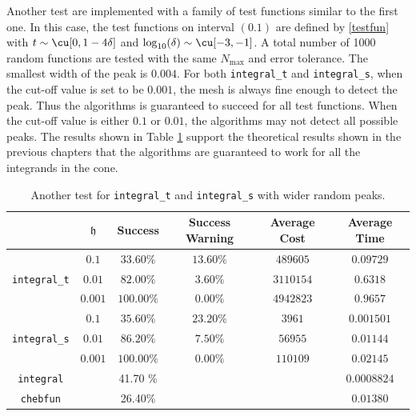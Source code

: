 \documentclass{iitthesis}
\theoremstyle{definition}
\theoremstyle{remark}
\begin{document}
Another test are implemented with a family of test functions similar to the first one. In this case, the test functions on interval $(0.1)$ are defined by \eqref{testfun} with  $t \sim \cu[0,1-4\delta]$ and $\log_{10}(\delta) \sim \cu[-3,-1]$. A total number of 1000 random functions are tested with the same $N_{\max}$ and error tolerance. The smallest width of the peak is $0.004$. For both {\tt integral\_t} and {\tt integral\_s}, when the cut-off value is set to be $0.001$, the mesh is always fine enough to detect the peak. Thus the algorithms is guaranteed to succeed for all test functions. When the cut-off value is either $0.1$ or $0.01$, the algorithms may not detect all possible peaks. The results shown in Table \ref{widerresultstable} support the theoretical results shown in the previous chapters that the algorithms are guaranteed to work for all the integrands in the cone.
\begin{table}[ht]
\caption{Another test for {\tt integral\_t} and {\tt integral\_s} with wider random peaks.}
\centering
\begin{tabular}{cccccc}
\hline\hline
& $\mathfrak{h}$ & Success & Success Warning & Average Cost & Average Time \\
\hline
&$0.1$  & $33.60\%$ &  $13.60\%$  & $489605$ & $0.09729$\\
{\tt integral\_t}
 &$0.01$  & $82.00\%$ & $3.60\%$ & $3110154$ & $0.6318$\\
&$0.001$ & $100.00\%$ &$0.00\%$ & $4942823$ & $0.9657$\\
\hline
&$0.1$  & $35.60\%$ &  $23.20\%$  & $3961$ & $0.001501$\\
{\tt integral\_s}
 &$0.01$  & $86.20\%$ & $7.50\%$ & $56955$ & $0.01144$\\
&$0.001$ & $100.00\%$ &$0.00\%$ & $110109$ & $0.02145$\\
\hline
{\tt integral} &  & 41.70 \% & & &$0.0008824$\\
{\tt chebfun} &  &26.40\% & & &$0.01380$\\
\hline
\end{tabular}
\label{widerresultstable}
\end{table}
\end{document}
